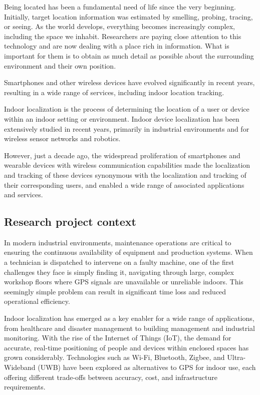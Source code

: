 \documentclass{ipgpmaster}
\begin{document}
Being located has been a fundamental need of life since the very beginning. Initially, target location information was estimated by smelling, probing, tracing, or seeing. As the world develops, everything becomes increasingly complex, including the space we inhabit. Researchers are paying close attention to this technology and are now dealing with a place rich in information. What is important for them is to obtain as much detail as possible about the surrounding environment and their own position. 

Smartphones and other wireless devices have evolved significantly in recent years, resulting in a wide range of services, including indoor location tracking. 

Indoor localization is the process of determining the location of a user or device within an indoor setting or environment. Indoor device localization has been extensively studied in recent years, primarily in industrial environments and for wireless sensor networks and robotics. 

However, just a decade ago, the widespread proliferation of smartphones and wearable devices with wireless communication capabilities made the localization and tracking of these devices synonymous with the localization and tracking of their corresponding users, and enabled a wide range of associated applications and services.

\subsection{Research project context}

In modern industrial environments, maintenance operations are critical to ensuring the continuous availability of equipment and production systems. When a technician is dispatched to intervene on a faulty machine, one of the first challenges they face is simply finding it, navigating through large, complex workshop floors where GPS signals are unavailable or unreliable indoors. This seemingly simple problem can result in significant time loss and reduced operational efficiency.

Indoor localization has emerged as a key enabler for a wide range of applications, from healthcare and disaster management to building management and industrial monitoring. With the rise of the Internet of Things (IoT), the demand for accurate, real-time positioning of people and devices within enclosed spaces has grown considerably. Technologies such as Wi-Fi, Bluetooth, Zigbee, and Ultra-Wideband (UWB) have been explored as alternatives to GPS for indoor use, each offering different trade-offs between accuracy, cost, and infrastructure requirements.
\end{document}
